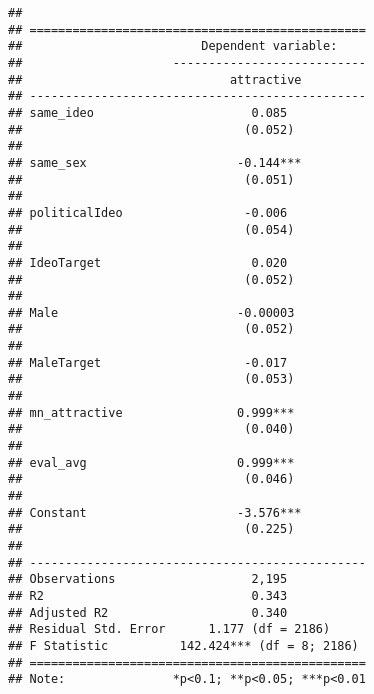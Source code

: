 \documentclass[]{article}
\begin{document}
\begin{verbatim}
## 
## ===============================================
##                         Dependent variable:    
##                     ---------------------------
##                             attractive         
## -----------------------------------------------
## same_ideo                      0.085           
##                               (0.052)          
##                                                
## same_sex                     -0.144***         
##                               (0.051)          
##                                                
## politicalIdeo                 -0.006           
##                               (0.054)          
##                                                
## IdeoTarget                     0.020           
##                               (0.052)          
##                                                
## Male                         -0.00003          
##                               (0.052)          
##                                                
## MaleTarget                    -0.017           
##                               (0.053)          
##                                                
## mn_attractive                0.999***          
##                               (0.040)          
##                                                
## eval_avg                     0.999***          
##                               (0.046)          
##                                                
## Constant                     -3.576***         
##                               (0.225)          
##                                                
## -----------------------------------------------
## Observations                   2,195           
## R2                             0.343           
## Adjusted R2                    0.340           
## Residual Std. Error      1.177 (df = 2186)     
## F Statistic          142.424*** (df = 8; 2186) 
## ===============================================
## Note:               *p<0.1; **p<0.05; ***p<0.01
\end{verbatim}
\end{document}
